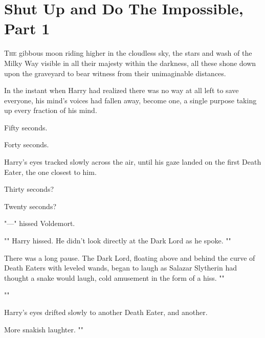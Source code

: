 \chapter{Shut Up and Do The Impossible, Part 1}

\lettrine{T}{he} gibbous moon
riding higher in the cloudless sky, the stars and wash of the Milky Way visible
in all their majesty within the darkness, all these shone down upon the
graveyard to bear witness from their unimaginable distances.

In the instant when Harry had realized there was no way at all left to save
everyone, his mind's voices had fallen away, become one, a single purpose
taking up every fraction of his mind.

Fifty seconds.

Forty seconds.

Harry's eyes tracked slowly across the air, until his gaze landed on the first
Death Eater, the one closest to him.

Thirty seconds?

Twenty seconds?

"—" hissed Voldemort.

"" Harry hissed. He didn't
look directly at the Dark Lord as he spoke. ""

There was a long pause. The Dark Lord, floating above and behind the curve of
Death Eaters with leveled wands, began to laugh as Salazar Slytherin had
thought a snake would laugh, cold amusement in the form of a hiss. ""

""

Harry's eyes drifted slowly to another Death Eater, and another.

More snakish laughter. ""

